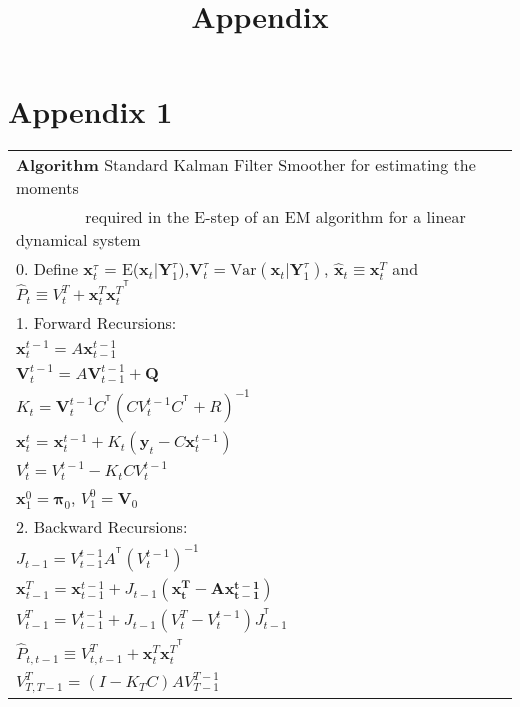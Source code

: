 \documentclass[12pt]{article}
\providecommand{\mb}[1]{\boldsymbol{#1}}
\newcommand{\bx}{\mb{x}}
\newcommand{\by}{\mb{y}}
\newcommand{\bY}{\mb{Y}}
\newcommand{\T}{^{\ensuremath{\mathsf{T}}}}           %
\begin{document}
\title{Appendix}

\section*{Appendix 1}
\label{sec:appendix1}

\begin{tabular}{l}
\hline
\textbf{Algorithm } Standard Kalman Filter Smoother for estimating the moments \\
$\qquad\quad\quad$ required in the E-step of an EM algorithm for a linear dynamical system\\
\hline
0. Define $\bx_t^{\tau}$ = E($\bx_t|\bY_1^{\tau}$),$\mathbf{V}_t^{\tau}=\text{Var}(\bx_t|\bY_1^{\tau})$, $\hat{\bx}_t \equiv \bx_t^T$ and $\hat{P}_t\equiv V_t^T+\bx_t^T{\bx_t^T}^{\T}$\\
1. Forward Recursions:\\
\hspace{4 mm} $\bx_t^{t-1}=A\bx_{t-1}^{t-1}$\\
\hspace{4 mm} $\mathbf{V}_t^{t-1}=A\mathbf{V}_{t-1}^{t-1}+\mathbf{Q}$\\
\hspace{4 mm} $K_t=\mathbf{V}_t^{t-1}C^{\T}(CV_t^{t-1}C^{\T}+R)^{-1}$\\
\hspace{4 mm} $\bx_t^t$ = $\bx_t^{t-1} + K_t (\by_t - C\bx_t^{t-1})$\\
\hspace{4 mm} $V_t^t=V_t^{t-1}-K_tCV_t^{t-1}$\\
\hspace{4 mm} $\bx_1^0=\mathbf{\pi}_0$, $V_1^0=\mathbf{V}_0$\\
2. Backward Recursions:\\
\hspace{4 mm} $J_{t-1} = V_{t-1}^{t-1}A^{\T}(V_t^{t-1})^{-1}$\\
\hspace{4 mm} $\bx_{t-1}^T=\bx_{t-1}^{t-1}+J_{t-1}(\mathbf{x_t^T-A\bx_{t-1}^{t-1}})$\\
\hspace{4 mm} $V_{t-1}^T = V_{t-1}^{t-1}+J_{t-1}(V_t^T-V_t^{t-1})J_{t-1}^{\T}$\\
\hspace{4 mm} $\hat{P}_{t,t-1}\equiv V_{t,t-1}^T+\bx_t^T{\bx_t^T}^{\T}$\\
\hspace{4 mm} $V_{T,T-1}^T=(I-K_TC)AV_{T-1}^{T-1}$\\
\hline
\end{tabular}
\end{document}
